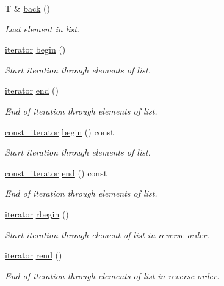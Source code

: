 \begin{DoxyCompactItemize}
T \& \mbox{\hyperlink{classsymlist_abc0570ff78ded9210ac26865519d36e3}{back}} ()
\begin{DoxyCompactList}\small\item\em Last element in list. \end{DoxyCompactList}\item 
\mbox{\hyperlink{structsymlist__iterator}{iterator}} \mbox{\hyperlink{classsymlist_a525b8d44af5d771fe15916372515cce0}{begin}} ()
\begin{DoxyCompactList}\small\item\em Start iteration through elements of list. \end{DoxyCompactList}\item 
\mbox{\hyperlink{structsymlist__iterator}{iterator}} \mbox{\hyperlink{classsymlist_a7283589fa01f79d722f8256d7a6a7883}{end}} ()
\begin{DoxyCompactList}\small\item\em End of iteration through elements of list. \end{DoxyCompactList}\item 
\mbox{\hyperlink{structsymlist__iterator}{const\+\_\+iterator}} \mbox{\hyperlink{classsymlist_a843d2df09f34079f6547f338b50823cd}{begin}} () const
\begin{DoxyCompactList}\small\item\em Start iteration through elements of list. \end{DoxyCompactList}\item 
\mbox{\hyperlink{structsymlist__iterator}{const\+\_\+iterator}} \mbox{\hyperlink{classsymlist_a189c41a13b3dd377c113d802258ef418}{end}} () const
\begin{DoxyCompactList}\small\item\em End of iteration through elements of list. \end{DoxyCompactList}\item 
\mbox{\hyperlink{structsymlist__iterator}{iterator}} \mbox{\hyperlink{classsymlist_ae5250e0c0c2bedee285f72584ddce29d}{rbegin}} ()
\begin{DoxyCompactList}\small\item\em Start iteration through element of list in reverse order. \end{DoxyCompactList}\item 
\mbox{\hyperlink{structsymlist__iterator}{iterator}} \mbox{\hyperlink{classsymlist_a421fc482e62f257a9081e9e1c29d66a6}{rend}} ()
\begin{DoxyCompactList}\small\item\em End of iteration through elements of list in reverse order. \end{DoxyCompactList}\item 

\end{DoxyCompactItemize}
